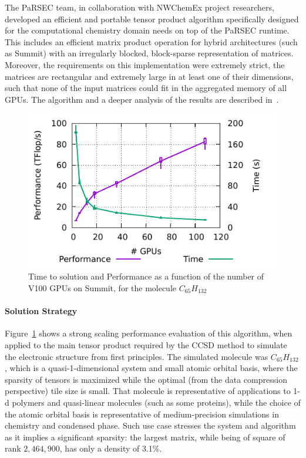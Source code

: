 %
%


The PaRSEC team, in collaboration with NWChemEx project researchers,
developed an efficient and portable tensor product algorithm
specifically designed for the computational chemistry domain needs on
top of the PaRSEC runtime. This includes an efficient matrix product
operation for hybrid architectures (such as Summit) with an irregularly
blocked, block-sparse representation of matrices. Moreover, the
requirements on this implementation were extremely strict, the
matrices are rectangular and extremely large in at least one of their
dimensions, such that none of the input matrices could fit in the
aggregated memory of all GPUs. The algorithm and a deeper analysis of
the results are described in~\cite{parsec::rr::irrbs}.

\begin{figure}
\centering\includegraphics[width=.9\linewidth]{projects/2.3.1-PMR/2.3.1.09-ParSEC/irr-bs-gemm-combined.pdf}
\caption{Time to solution and Performance as a function of the number
  of V100 GPUs on Summit, for the molecule
  $C_{65}H_{132}$\label{fig:irrbsgemm}}
\end{figure}\paragraph{Solution Strategy}

Figure~\ref{fig:irrbsgemm} shows a strong scaling performance
evaluation of this algorithm, when applied to the main tensor product
required by the CCSD method to simulate the electronic structure from
first principles. The simulated molecule was $C_{65}H_{132}$, which is
a quasi-1-dimensional system and small atomic orbital basis, where the
sparsity of tensors is maximized while the optimal (from the data
compression perspective) tile size is small. That molecule is
representative of applications to 1-d polymers and quasi-linear
molecules (such as some proteins), while the choice of the atomic
orbital basis is representative of medium-precision simulations in
chemistry and condensed phase. Such use case stresses the system and
algorithm as it implies a significant sparsity: the largest matrix,
while being of square of rank $2,464,900$, has only a density of
3.1\%.

